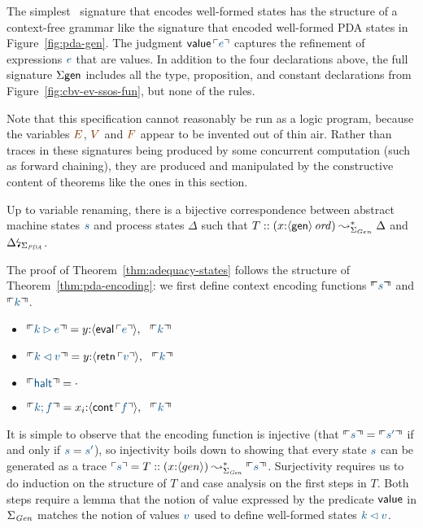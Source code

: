 The simplest \sls~signature that encodes well-formed states has the
structure of a context-free grammar like the signature that encoded
well-formed PDA states in Figure~\ref{fig:pda-gen}. The judgment ${\sf
  value}\,\interp{e}$ captures the refinement of expressions $\obj{e}$
that are values. In addition to the four declarations above, the full
signature $\Sigma\sf gen$ includes all the type, proposition, and
constant declarations from Figure~\ref{fig:cbv-ev-ssos-fun}, but none
of the rules. 

Note that this specification cannot reasonably be run as a logic
program, because the variables $\lf{E}$, $\lf{V}$ and $\lf{F}$ appear
to be invented out of thin air.  Rather than traces in these
signatures being produced by some concurrent computation (such as
forward chaining), they are produced and manipulated by the
constructive content of theorems like the ones in this section.

\bigskip
\begin{theorem}[Encoding] 
\label{thm:adequacy-states}
Up to variable renaming, there is a bijective correspondence between
abstract machine states $\obj{s}$ and process states $\Delta$ such that
$T :: (x{:}{\langle {\sf gen} \rangle}\,{{\it ord}}) \leadsto^*_{\Sigma_{Gen}} \Delta$
and ${\Delta}{\mbox{\lightning}}_{\Sigma_{\it PDA}}$.
\end{theorem}
\bigskip

The proof of Theorem~\ref{thm:adequacy-states} follows the structure
of Theorem~\ref{thm:pda-encoding}: we first define context encoding functions
$\ctxinterp{s}$ and $\ctxinterp{k}$. 
\smallskip
\begin{itemize}
\item $\ctxinterp{k \rhd e} = y{:}\susp{{\sf eval}\,\interp{e}}, ~~
        \ctxinterp{k}$
\item $\ctxinterp{k \lhd v} = y{:}\susp{{\sf retn}\,\interp{v}}, ~~
        \ctxinterp{k}$
\item $\ctxinterp{\sf halt} = \cdot$
\item $\ctxinterp{k; f} = x_{i}{:}\susp{{\sf cont}\,\interp{f}}, ~~ \ctxinterp{k}$
\end{itemize}
\smallskip
It is simple to observe that the encoding function is injective 
(that $\ctxinterp{s} = \ctxinterp{s'}$ if and only if $\obj{s} = \obj{s'}$),
so injectivity boils down to showing that every state $\obj{s}$ can be
generated as a trace 
$\interp{s} = T :: (x{:}\susp{gen}) \leadsto^*_{\Sigma_{\it Gen}} \ctxinterp{s}$.
Surjectivity requires us to do induction on the structure of $T$ and 
case analysis on the first steps in $T$. Both steps require a lemma
that the notion of value expressed by the predicate ${\sf value}$
in $\Sigma_{\it Gen}$ matches the notion of values $\obj{v}$ used to define
well-formed states $\obj{k \lhd v}$. 

